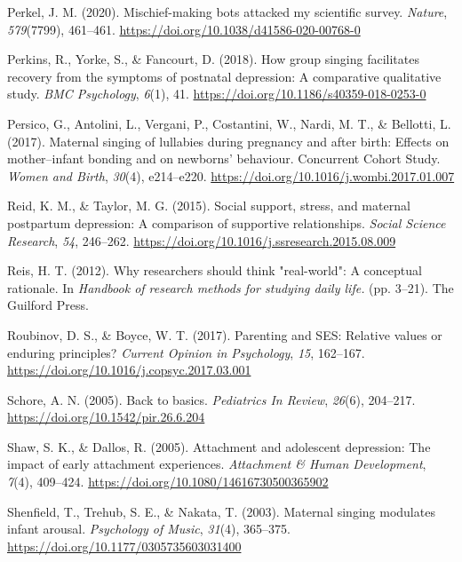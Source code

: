 \documentclass[
]{article}
\newlength{\cslhangindent}
\newenvironment{CSLReferences}[2] %
 {\begin{list}{}{%
  \setlength{\itemindent}{0pt}
  \setlength{\leftmargin}{0pt}
  \setlength{\parsep}{0pt}
  \ifodd #1
   \setlength{\leftmargin}{\cslhangindent}
   \setlength{\itemindent}{-1\cslhangindent}
  \fi
  \setlength{\itemsep}{#2\baselineskip}}}
 {\end{list}}
\begin{document}
\begin{CSLReferences}{1}{0}
Perkel, J. M. (2020). Mischief-making bots attacked my scientific
survey. \emph{Nature}, \emph{579}(7799), 461--461.
\url{https://doi.org/10.1038/d41586-020-00768-0}

Perkins, R., Yorke, S., \& Fancourt, D. (2018). How group singing
facilitates recovery from the symptoms of postnatal depression: A
comparative qualitative study. \emph{BMC Psychology}, \emph{6}(1), 41.
\url{https://doi.org/10.1186/s40359-018-0253-0}

Persico, G., Antolini, L., Vergani, P., Costantini, W., Nardi, M. T., \&
Bellotti, L. (2017). Maternal singing of lullabies during pregnancy and
after birth: {Effects} on mother--infant bonding and on newborns'
behaviour. {Concurrent Cohort Study}. \emph{Women and Birth},
\emph{30}(4), e214--e220.
\url{https://doi.org/10.1016/j.wombi.2017.01.007}

Reid, K. M., \& Taylor, M. G. (2015). Social support, stress, and
maternal postpartum depression: {A} comparison of supportive
relationships. \emph{Social Science Research}, \emph{54}, 246--262.
\url{https://doi.org/10.1016/j.ssresearch.2015.08.009}

Reis, H. T. (2012). Why researchers should think "real-world": {A}
conceptual rationale. In \emph{Handbook of research methods for studying
daily life.} (pp. 3--21). The Guilford Press.

Roubinov, D. S., \& Boyce, W. T. (2017). Parenting and {SES}: {Relative}
values or enduring principles? \emph{Current Opinion in Psychology},
\emph{15}, 162--167. \url{https://doi.org/10.1016/j.copsyc.2017.03.001}

Schore, A. N. (2005). Back to basics. \emph{Pediatrics In Review},
\emph{26}(6), 204--217. \url{https://doi.org/10.1542/pir.26.6.204}

Shaw, S. K., \& Dallos, R. (2005). Attachment and adolescent depression:
{The} impact of early attachment experiences. \emph{Attachment \& Human
Development}, \emph{7}(4), 409--424.
\url{https://doi.org/10.1080/14616730500365902}

Shenfield, T., Trehub, S. E., \& Nakata, T. (2003). Maternal singing
modulates infant arousal. \emph{Psychology of Music}, \emph{31}(4),
365--375. \url{https://doi.org/10.1177/0305735603031400}


\end{CSLReferences}
\end{document}
